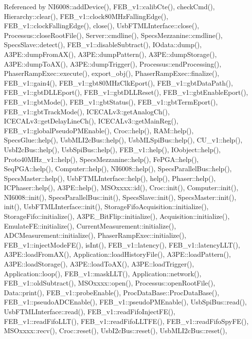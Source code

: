 Referenced by N\+I6008\+::add\+Device(), F\+E\+B\+\_\+v1\+::calib\+Cte(), check\+Cmd(), Hierarchy\+::clear(), F\+E\+B\+\_\+v1\+::clock80\+M\+Hz\+Falling\+Edge(), F\+E\+B\+\_\+v1\+::clock\+Falling\+Edge(), close(), Usb\+F\+T\+M\+L\+Interface\+::close(), Processus\+::close\+Root\+File(), Server\+::cmdline(), Specs\+Mezzanine\+::cmdline(), Specs\+Slave\+::detect(), F\+E\+B\+\_\+v1\+::disable\+Subtract(), I\+Odata\+::dump(), A3\+P\+E\+::dump\+From\+A\+X(), A3\+P\+E\+::dump\+Pattern(), A3\+P\+E\+::dump\+Storage(), A3\+P\+E\+::dump\+To\+A\+X(), A3\+P\+E\+::dump\+Trigger(), Processus\+::end\+Processing(), Phaser\+Ramp\+Exec\+::execute(), export\+\_\+obj(), Phaser\+Ramp\+Exec\+::finalize(), F\+E\+B\+\_\+v1\+::gain4(), F\+E\+B\+\_\+v1\+::gbt80\+M\+Hz\+Clk\+Eport(), F\+E\+B\+\_\+v1\+::gbt\+Data\+Path(), F\+E\+B\+\_\+v1\+::gbt\+D\+L\+L\+Eport(), F\+E\+B\+\_\+v1\+::gbt\+D\+L\+L\+Reset(), F\+E\+B\+\_\+v1\+::gbt\+Enable\+Eport(), F\+E\+B\+\_\+v1\+::gbt\+Mode(), F\+E\+B\+\_\+v1\+::gbt\+Status(), F\+E\+B\+\_\+v1\+::gbt\+Term\+Eport(), F\+E\+B\+\_\+v1\+::gbt\+Track\+Mode(), I\+C\+E\+C\+A\+Lv3\+::get\+Analog\+Ch(), I\+C\+E\+C\+A\+Lv3\+::get\+Delay\+Line\+Ch(), I\+C\+E\+C\+A\+Lv3\+::get\+Main\+Reg(), F\+E\+B\+\_\+v1\+::global\+Pseudo\+P\+M\+Enable(), Croc\+::help(), R\+A\+M\+::help(), Specs\+Glue\+::help(), Usb\+M\+L\+I2c\+Bus\+::help(), Usb\+M\+L\+Spi\+Bus\+::help(), C\+U\+\_\+v1\+::help(), Usb\+I2c\+Bus\+::help(), Usb\+Spi\+Bus\+::help(), F\+E\+B\+\_\+v1\+::help(), I\+Oobject\+::help(), Proto40\+M\+Hz\+\_\+v1\+::help(), Specs\+Mezzanine\+::help(), Fe\+P\+G\+A\+::help(), Seq\+P\+G\+A\+::help(), Computer\+::help(), N\+I6008\+::help(), Specs\+Parallel\+Bus\+::help(), Specs\+Master\+::help(), Usb\+F\+T\+M\+L\+Interface\+::help(), help(), Phaser\+::help(), I\+C\+Phaser\+::help(), A3\+P\+E\+::help(), M\+S\+Oxxxx\+::id(), Croc\+::init(), Computer\+::init(), N\+I6008\+::init(), Specs\+Parallel\+Bus\+::init(), Specs\+Slave\+::init(), Specs\+Master\+::init(), init(), Usb\+F\+T\+M\+L\+Interface\+::init(), Storage\+Fifo\+Acquisition\+::initialize(), Storage\+Fifo\+::initialize(), A3\+P\+E\+\_\+\+Bit\+Flip\+::initialize(), Acquisition\+::initialize(), Emulate\+F\+E\+::initialize(), Current\+Measurement\+::initialize(), A\+D\+C\+Measurement\+::initialize(), Phaser\+Ramp\+Exec\+::initialize(), F\+E\+B\+\_\+v1\+::inject\+Mode\+F\+E(), is\+Int(), F\+E\+B\+\_\+v1\+::latency(), F\+E\+B\+\_\+v1\+::latency\+L\+L\+T(), A3\+P\+E\+::load\+From\+A\+X(), Application\+::load\+History\+File(), A3\+P\+E\+::load\+Pattern(), A3\+P\+E\+::load\+Storage(), A3\+P\+E\+::load\+To\+A\+X(), A3\+P\+E\+::load\+Trigger(), Application\+::loop(), F\+E\+B\+\_\+v1\+::mask\+L\+L\+T(), Application\+::network(), F\+E\+B\+\_\+v1\+::old\+Subtract(), M\+S\+Oxxxx\+::open(), Processus\+::open\+Root\+File(), Data\+::print(), F\+E\+B\+\_\+v1\+::probe\+Enable(), Proc\+Data\+Base\+::\+Proc\+Data\+Base(), F\+E\+B\+\_\+v1\+::pseudo\+A\+D\+C\+Enable(), F\+E\+B\+\_\+v1\+::pseudo\+P\+M\+Enable(), Usb\+Spi\+Bus\+::read(), Usb\+F\+T\+M\+L\+Interface\+::read(), F\+E\+B\+\_\+v1\+::read\+Fifo\+Inject\+F\+E(), F\+E\+B\+\_\+v1\+::read\+Fifo\+L\+L\+T(), F\+E\+B\+\_\+v1\+::read\+Fifo\+L\+L\+T\+F\+E(), F\+E\+B\+\_\+v1\+::read\+Fifo\+Spy\+F\+E(), M\+S\+Oxxxx\+::recv(), Croc\+::reset(), Usb\+I2c\+Bus\+::reset(), Usb\+M\+L\+I2c\+Bus\+::reset(), 